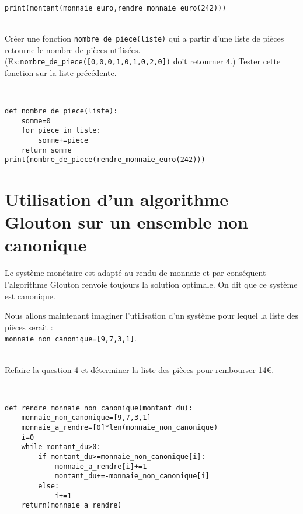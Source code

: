 \begin{solution}~\ \\
\begin{verbatim}
print(montant(monnaie_euro,rendre_monnaie_euro(242)))
\end{verbatim}
\end{solution}

\begin{exercice}~\\
Créer une fonction \verb?nombre_de_piece(liste)? qui a partir d'une liste de pièces retourne le nombre de pièces utilisées. (Ex:\verb?nombre_de_piece([0,0,0,1,0,1,0,2,0])? doit retourner \verb?4?.) Tester cette fonction sur la liste précédente.
\end{exercice}

\begin{solution}~\ \\
\begin{verbatim}
def nombre_de_piece(liste):
    somme=0
    for piece in liste:
        somme+=piece
    return somme
print(nombre_de_piece(rendre_monnaie_euro(242)))
\end{verbatim}
\end{solution}

\section{Utilisation d'un algorithme Glouton sur un ensemble non canonique}

Le système monétaire est adapté au rendu de monnaie et par conséquent l'algorithme Glouton renvoie toujours la solution optimale. On dit que ce système est canonique.

Nous allons maintenant imaginer l'utilisation d'un système pour lequel la liste des pièces serait :\\ \verb?monnaie_non_canonique=[9,7,3,1]?.

\begin{exercice}~\\
Refaire la question 4 et déterminer la liste des pièces pour rembourser 14\euro.
\end{exercice}

\begin{solution}~\ \\
\begin{verbatim}
def rendre_monnaie_non_canonique(montant_du):
    monnaie_non_canonique=[9,7,3,1]
    monnaie_a_rendre=[0]*len(monnaie_non_canonique)
    i=0
    while montant_du>0:
        if montant_du>=monnaie_non_canonique[i]:
            monnaie_a_rendre[i]+=1
            montant_du+=-monnaie_non_canonique[i]
        else:
            i+=1
    return(monnaie_a_rendre)
 \end{verbatim}
\end{solution}

